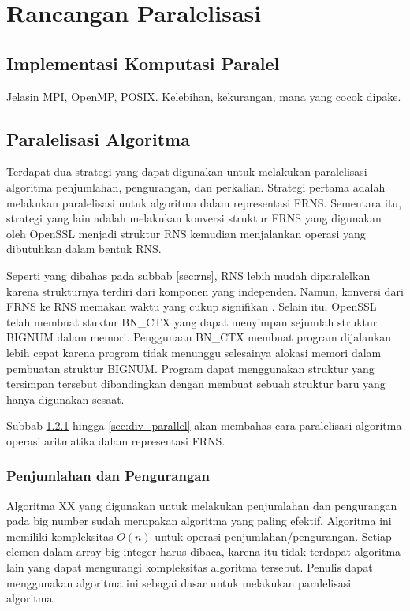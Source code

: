 \section{Rancangan Paralelisasi}
\subsection{Implementasi Komputasi Paralel} \label{sec:parallel_env}

Jelasin MPI, OpenMP, POSIX. Kelebihan, kekurangan, mana yang cocok dipake.

\subsection{Paralelisasi Algoritma}
Terdapat dua strategi yang dapat digunakan untuk melakukan paralelisasi algoritma penjumlahan, pengurangan, dan perkalian. Strategi pertama adalah melakukan paralelisasi untuk algoritma dalam representasi FRNS. Sementara itu, strategi yang lain adalah melakukan konversi struktur FRNS yang digunakan oleh OpenSSL menjadi struktur RNS kemudian menjalankan operasi yang dibutuhkan dalam bentuk RNS.

Seperti yang dibahas pada subbab \ref{sec:rns}, RNS lebih mudah diparalelkan karena strukturnya terdiri dari komponen yang independen. Namun, konversi dari FRNS ke RNS memakan waktu yang cukup signifikan . Selain itu, OpenSSL telah membuat stuktur BN\_CTX yang dapat menyimpan sejumlah struktur BIGNUM dalam memori. Penggunaan BN\_CTX membuat program dijalankan lebih cepat karena program tidak menunggu selesainya alokasi memori dalam pembuatan struktur BIGNUM. Program dapat menggunakan struktur yang tersimpan tersebut dibandingkan dengan membuat sebuah struktur baru yang hanya digunakan sesaat.

Subbab \ref{sec:add_sub_parallel} hingga \ref{sec:div_parallel} akan membahas cara paralelisasi algoritma operasi aritmatika dalam representasi FRNS.

\subsubsection{Penjumlahan dan Pengurangan}\label{sec:add_sub_parallel}
Algoritma XX  yang digunakan untuk melakukan penjumlahan dan pengurangan pada big number sudah merupakan algoritma yang paling efektif. Algoritma ini memiliki kompleksitas $O(n)$ untuk operasi penjumlahan/pengurangan. Setiap elemen dalam array big integer harus dibaca, karena itu tidak terdapat algoritma lain yang dapat mengurangi kompleksitas algoritma tersebut. Penulis dapat menggunakan algoritma ini sebagai dasar untuk melakukan paralelisasi algoritma.

